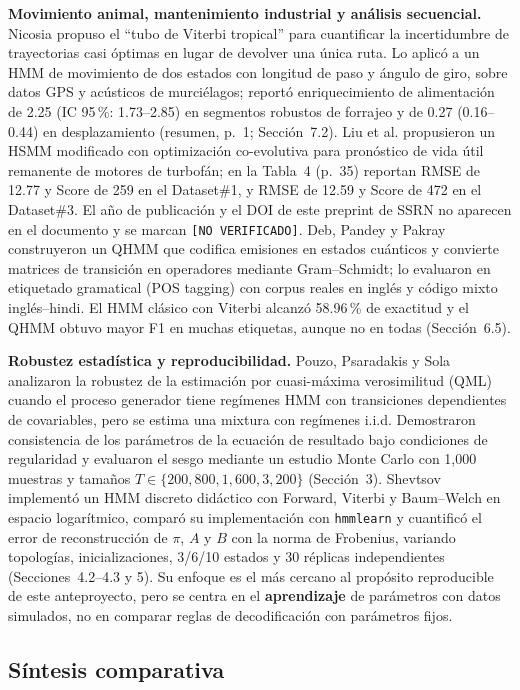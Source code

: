 \documentclass[11pt,a4paper]{article}
\begin{document}
\textbf{Movimiento animal, mantenimiento industrial y análisis secuencial.} Nicosia \cite{nicosia2026} propuso el ``tubo de Viterbi tropical'' para cuantificar la incertidumbre de trayectorias casi óptimas en lugar de devolver una única ruta. Lo aplicó a un HMM de movimiento de dos estados con longitud de paso y ángulo de giro, sobre datos GPS y acústicos de murciélagos; reportó enriquecimiento de alimentación de 2.25 (IC 95\,\%: 1.73--2.85) en segmentos robustos de forrajeo y de 0.27 (0.16--0.44) en desplazamiento (resumen, p.~1; Sección~7.2). Liu et al. \cite{liu_sf} propusieron un HSMM modificado con optimización co-evolutiva para pronóstico de vida útil remanente de motores de turbofán; en la Tabla~4 (p.~35) reportan RMSE de 12.77 y Score de 259 en el Dataset\#1, y RMSE de 12.59 y Score de 472 en el Dataset\#3. El año de publicación y el DOI de este preprint de SSRN no aparecen en el documento y se marcan \texttt{[NO VERIFICADO]}. Deb, Pandey y Pakray \cite{deb2026} construyeron un QHMM que codifica emisiones en estados cuánticos y convierte matrices de transición en operadores mediante Gram--Schmidt; lo evaluaron en etiquetado gramatical (POS tagging) con corpus reales en inglés y código mixto inglés--hindi. El HMM clásico con Viterbi alcanzó 58.96\,\% de exactitud y el QHMM obtuvo mayor F1 en muchas etiquetas, aunque no en todas (Sección~6.5).

\textbf{Robustez estadística y reproducibilidad.} Pouzo, Psaradakis y Sola \cite{pouzo2025} analizaron la robustez de la estimación por cuasi-máxima verosimilitud (QML) cuando el proceso generador tiene regímenes HMM con transiciones dependientes de covariables, pero se estima una mixtura con regímenes i.i.d. Demostraron consistencia de los parámetros de la ecuación de resultado bajo condiciones de regularidad y evaluaron el sesgo mediante un estudio Monte Carlo con 1{,}000 muestras y tamaños \(T\in\{200,800,1{,}600,3{,}200\}\) (Sección~3). Shevtsov \cite{shevtsov2025} implementó un HMM discreto didáctico con Forward, Viterbi y Baum--Welch en espacio logarítmico, comparó su implementación con \texttt{hmmlearn} y cuantificó el error de reconstrucción de \(\pi\), \(A\) y \(B\) con la norma de Frobenius, variando topologías, inicializaciones, 3/6/10 estados y 30 réplicas independientes (Secciones~4.2--4.3 y 5). Su enfoque es el más cercano al propósito reproducible de este anteproyecto, pero se centra en el \textbf{aprendizaje} de parámetros con datos simulados, no en comparar reglas de decodificación con parámetros fijos.

\subsection{Síntesis comparativa}
\end{document}
